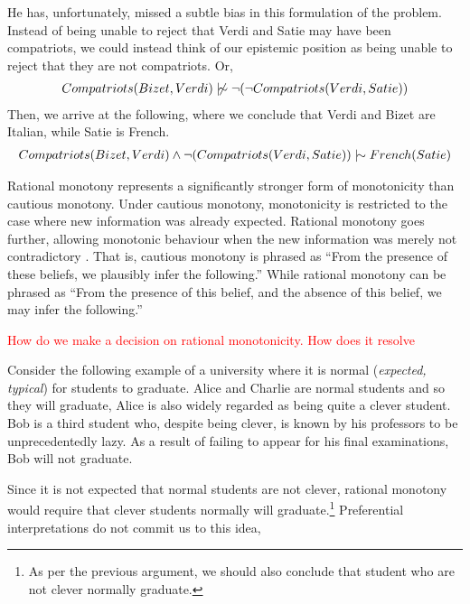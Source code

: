 He has, unfortunately, missed a subtle bias in this formulation of the problem. Instead of being unable to reject that Verdi
and Satie may have been compatriots, we could instead think of our epistemic position as being unable to reject that
they are not compatriots. Or,
\begin{align}
	Compatriots(Bizet,Verdi) \ntwiddle \neg (\neg Compatriots(Verdi,Satie))
\end{align}
Then, we arrive at the following, where we conclude that Verdi and Bizet are Italian, while Satie is French.
\begin{align}
	Compatriots(Bizet, Verdi) \land \neg(Compatriots(Verdi,Satie)) \twiddle French(Satie)
\end{align}

Rational monotony represents a significantly stronger form of monotonicity than cautious monotony. Under cautious
monotony, monotonicity is restricted to the case where new information was already expected. Rational monotony goes
further, allowing monotonic behaviour when the new information was merely not contradictory \cite{sep-logic-nonmonotonic-Stanford}.
That is, cautious monotony is phrased as ``From the presence of these beliefs, we plausibly infer the following.'' While
rational monotony can be phrased as ``From the presence of this belief, and the absence of this belief, we may infer the
following.''

\textcolor{red}{How do we make a decision on rational monotonicity. How does it resolve}

Consider the following example of a university where it is normal (\textit{expected, typical}) for students to graduate.
Alice and Charlie are normal students and so they will graduate, Alice is also widely regarded as being quite a clever
student. Bob is a third student who, despite being clever, is known by his professors to be unprecedentedly lazy. As a
result of failing to appear for his final examinations, Bob will not graduate.

Since it is not expected that normal students are not clever, rational monotony would require that clever students
normally will graduate.\footnote{As per the previous argument, we should also conclude that student who are not clever normally
graduate.} Preferential interpretations do not commit us to this idea,

